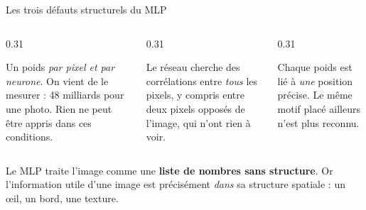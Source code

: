 
\begin{frame}{Les trois défauts structurels du MLP}
\begin{columns}[t]
\begin{column}{0.31\textwidth}
\begin{wbox}
Un poids \emph{par pixel et par neurone}. On vient de le mesurer : 48 milliards
pour une photo. Rien ne peut être appris dans ces conditions.
\end{wbox}
\end{column}
\begin{column}{0.31\textwidth}
\begin{wbox}
Le réseau cherche des corrélations entre \emph{tous} les pixels, y compris entre
deux pixels opposés de l'image, qui n'ont rien à voir.
\end{wbox}
\end{column}
\begin{column}{0.31\textwidth}
\begin{wbox}
Chaque poids est lié à \emph{une} position précise. Le même motif placé
ailleurs n'est plus reconnu.
\end{wbox}
\end{column}
\end{columns}
\vspace{2mm}
\begin{kbox}
Le MLP traite l'image comme une \textbf{liste de nombres sans structure}. Or
l'information utile d'une image est précisément \emph{dans} sa structure
spatiale : un œil, un bord, une texture.
\end{kbox}
\end{frame}

